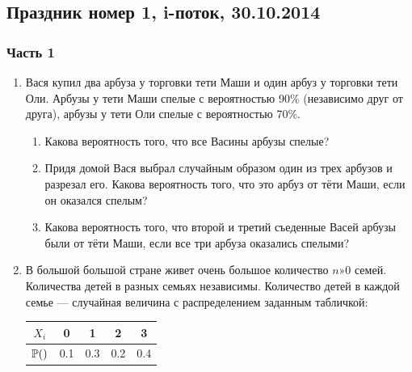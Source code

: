 \documentclass[12pt, a4paper]{article}\usepackage[]{graphicx}\usepackage[]{color}
\begin{document}
\subsection{Праздник номер 1, i-поток, 30.10.2014}

\subsubsection*{ Часть 1}

\begin{enumerate}


\item Вася купил два арбуза у торговки тети Маши и один арбуз у торговки тети Оли. Арбузы у тети Маши спелые с вероятностью 90\% (независимо друг от друга), арбузы у тети Оли спелые с вероятностью 70\%.

\begin{enumerate}
\item Какова вероятность того, что все Васины арбузы спелые?
\item Придя домой Вася выбрал случайным образом один из трех арбузов и разрезал его. Какова вероятность того, что это арбуз от тёти Маши, если он оказался спелым?
\item Какова вероятность того, что второй и третий съеденные Васей арбузы были от тёти Маши, если все три арбуза оказались спелыми?
\end{enumerate}


\item В большой большой стране живет очень большое количество $n»0$ семей. Количества детей в разных семьях независимы. Количество детей в каждой семье — случайная величина с распределением заданным табличкой:


\begin{tabular}{ccccc}
$X_i$ & 0 & 1 & 2 & 3 \\
\hline
$\P()$ & 0.1 & 0.3 & 0.2 & 0.4 \\
\end{tabular}


\end{enumerate}
\end{document}
